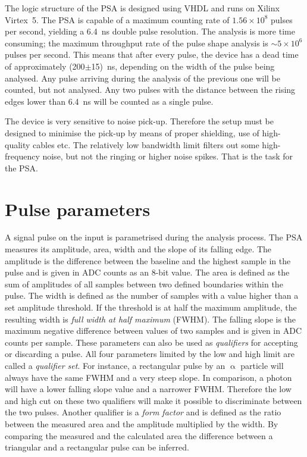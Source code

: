 \documentclass[12pt]{packages/mytustyle}  %
\begin{document}
The logic structure of the PSA is designed using VHDL and runs on Xilinx Virtex~5. The PSA is capable of a maximum counting rate of $1.56\times10^8$ pulses per second, yielding a 6.4~ns double pulse resolution. The analysis is more time consuming; the maximum throughput rate of the pulse shape analysis is $\sim5\times10^6$ pulses per second. This means that after every pulse, the device has a dead time of approximately (200$\pm$15)~ns, depending on the width of the pulse being analysed. Any pulse arriving during the analysis of the previous one will be counted, but not analysed. Any two pulses with the distance between the rising edges lower than 6.4~ns will be counted as a single pulse.

The device is very sensitive to noise pick-up. Therefore the setup must be designed to minimise the pick-up by means of proper shielding, use of high-quality cables etc. The relatively low bandwidth limit filters out some high-frequency noise, but not the ringing or higher noise spikes. That is the task for the PSA.

\section{Pulse parameters}
A signal pulse on the input is parametrised during the analysis process. The PSA measures its amplitude, area, width and the slope of its falling edge. The amplitude is the difference between the baseline and the highest sample in the pulse and is given in ADC counts as an 8-bit value. The area is defined as the sum of amplitudes of all samples between two defined boundaries within the pulse. The width is defined as the number of samples with a value higher than a set amplitude threshold. If the threshold is at half the maximum amplitude, the resulting width is \emph{full width at half maximum} (FWHM). The falling slope is the maximum negative difference between values of two samples and is given in ADC counts per sample. These parameters can also be used as \emph{qualifiers} for accepting or discarding a pulse. All four parameters limited by the low and high limit are called a \emph{qualifier set}. For instance, a rectangular pulse by an $\upalpha$ particle will always have the same FWHM and a very steep slope. In comparison, a photon will have a lower falling slope value and a narrower FWHM. Therefore the low and high cut on these two qualifiers will make it possible to discriminate between the two pulses. Another qualifier is a \emph{form factor} and is defined as the ratio between the measured area and the amplitude multiplied by the width. By comparing the measured and the calculated area the difference between a triangular and a rectangular pulse can be inferred.
\end{document}
